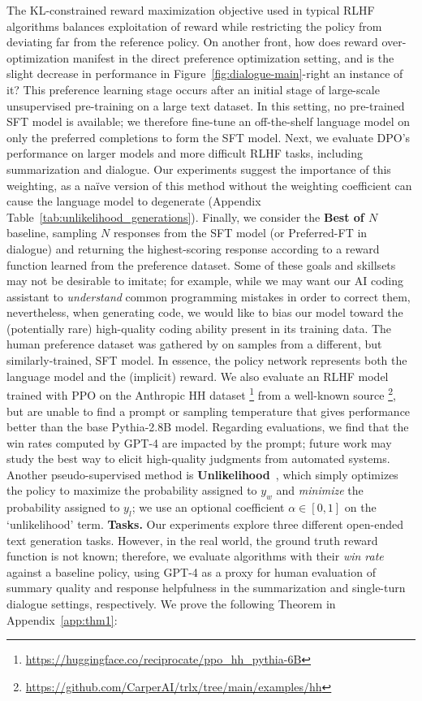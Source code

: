 The KL-constrained reward maximization objective used in typical RLHF algorithms balances exploitation of reward while restricting the policy from deviating far from the reference policy. On another front, how does reward over-optimization manifest in the direct preference optimization setting, and is the slight decrease in performance in Figure~\ref{fig:dialogue-main}-right an instance of it? This preference learning stage occurs after an initial stage of large-scale unsupervised pre-training on a large text dataset. In this setting, no pre-trained SFT model is available; we therefore fine-tune an off-the-shelf language model on only the preferred completions to form the SFT model. Next, we evaluate DPO's performance on larger models and more difficult RLHF tasks, including summarization and dialogue. Our experiments suggest the importance of this weighting, as a na\"ive version of this method without the weighting coefficient can cause the language model to degenerate (Appendix Table~\ref{tab:unlikelihood_generations}). Finally, we consider the \textbf{Best of $N$} baseline, sampling $N$ responses from the SFT model (or Preferred-FT in dialogue) and returning the highest-scoring response according to a reward function learned from the preference dataset. Some of these goals and skillsets may not be desirable to imitate; for example, while we may want our AI coding assistant to \textit{understand} common programming mistakes in order to correct them, nevertheless, when generating code, we would like to bias our model toward the (potentially rare) high-quality coding ability present in its training data. The human preference dataset was gathered by \citeauthor{stiennon2022learning} on samples from a different, but similarly-trained, SFT model. In essence, the policy network represents both the language model and the (implicit) reward. We also evaluate an RLHF model trained with PPO on the Anthropic HH dataset \footnote{\url{https://huggingface.co/reciprocate/ppo_hh_pythia-6B}} from a well-known source \footnote{\url{https://github.com/CarperAI/trlx/tree/main/examples/hh}}, but are unable to find a prompt or sampling temperature that gives performance better than the base Pythia-2.8B model. Regarding evaluations, we find that the win rates computed by GPT-4 are impacted by the prompt; future work may study the best way to elicit high-quality judgments from automated systems. Another pseudo-supervised method is \textbf{Unlikelihood}~\citep{welleck2019neural}, which simply optimizes the policy to maximize the probability assigned to $y_w$ and \textit{minimize} the probability assigned to $y_l$; we use an optional coefficient $\alpha\in[0,1]$ on the `unlikelihood' term. \textbf{Tasks.} Our experiments explore three different open-ended text generation tasks. However, in the real world, the ground truth reward function is not known; therefore, we evaluate algorithms with their \textit{win rate} against a baseline policy, using GPT-4 as a proxy for human evaluation of summary quality and response helpfulness in the summarization and single-turn dialogue settings, respectively. We prove the following Theorem in Appendix~\ref{app:thm1}:

